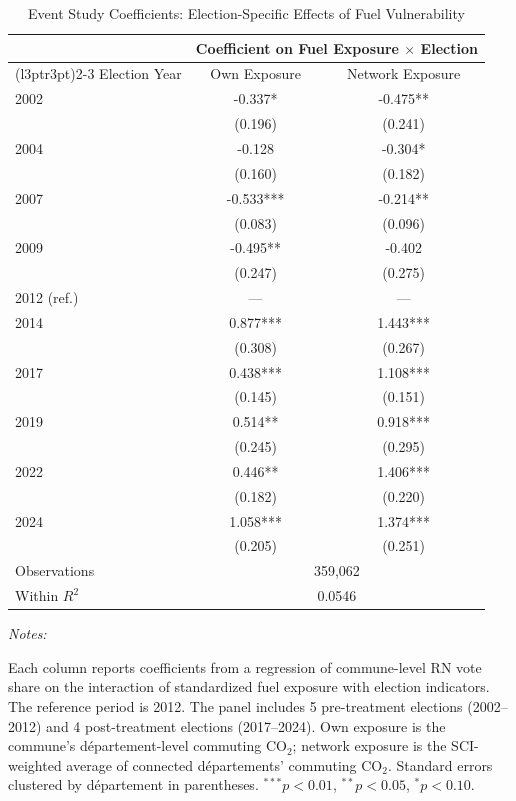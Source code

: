 \begin{table}[!h]
\centering
\caption{Event Study Coefficients: Election-Specific Effects of Fuel Vulnerability}
\centering
\fontsize{10}{12}\selectfont
\begin{threeparttable}
\begin{tabular}[t]{lcc}
\toprule
\multicolumn{1}{c}{ } & \multicolumn{2}{c}{Coefficient on Fuel Exposure $\times$ Election} \\
\cmidrule(l{3pt}r{3pt}){2-3}
Election Year & Own Exposure & Network Exposure\\
\midrule
2002 & -0.337* & -0.475**\\
 & (0.196) & (0.241)\\
2004 & -0.128 & -0.304*\\
 & (0.160) & (0.182)\\
2007 & -0.533*** & -0.214**\\
 & (0.083) & (0.096)\\
2009 & -0.495** & -0.402\\
 & (0.247) & (0.275)\\
2012 (ref.) & --- & ---\\
2014 & 0.877*** & 1.443***\\
 & (0.308) & (0.267)\\
2017 & 0.438*** & 1.108***\\
 & (0.145) & (0.151)\\
2019 & 0.514** & 0.918***\\
 & (0.245) & (0.295)\\
2022 & 0.446** & 1.406***\\
 & (0.182) & (0.220)\\
2024 & 1.058*** & 1.374***\\
 & (0.205) & (0.251)\\
\midrule Observations & \multicolumn{2}{c}{359,062} \\
Within $R^2$ & \multicolumn{2}{c}{0.0546} \\
\bottomrule
\end{tabular}
\begin{tablenotes}
\item \textit{Notes:} 
\item Each column reports coefficients from a regression of commune-level RN vote share on the interaction of standardized fuel exposure with election indicators. The reference period is 2012. The panel includes 5 pre-treatment elections (2002--2012) and 4 post-treatment elections (2017--2024). Own exposure is the commune's d\'{e}partement-level commuting CO$_2$; network exposure is the SCI-weighted average of connected d\'{e}partements' commuting CO$_2$. Standard errors clustered by d\'{e}partement in parentheses. $^{***}p<0.01$, $^{**}p<0.05$, $^{*}p<0.10$.
\end{tablenotes}
\end{threeparttable}
\end{table}
